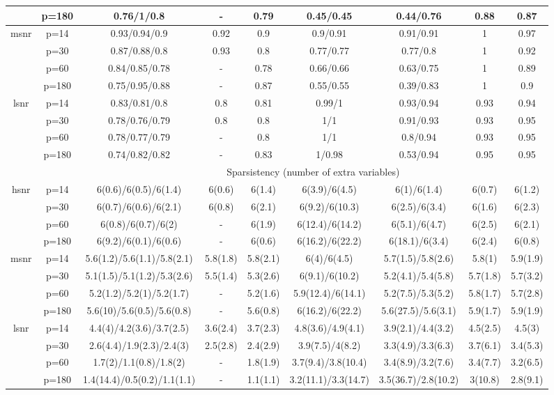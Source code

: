 \begin{table}[ht]
{\begin{tabular}{|c|c|ccccccc|}
   & p=180 & 0.76/1/0.8 & - & 0.79 & 0.45/0.45 & 0.44/0.76 & 0.88 & 0.87 \\ 
  \midrule\multirow{4}[2]{*}{msnr} & p=14 & 0.93/0.94/0.9 & 0.92 & 0.9 & 0.9/0.91 & 0.91/0.91 & 1 & 0.97 \\ 
   & p=30 & 0.87/0.88/0.8 & 0.93 & 0.8 & 0.77/0.77 & 0.77/0.8 & 1 & 0.92 \\ 
   & p=60 & 0.84/0.85/0.78 & - & 0.78 & 0.66/0.66 & 0.63/0.75 & 1 & 0.89 \\ 
   & p=180 & 0.75/0.95/0.88 & - & 0.87 & 0.55/0.55 & 0.39/0.83 & 1 & 0.9 \\ 
  \midrule\multirow{4}[2]{*}{lsnr} & p=14 & 0.83/0.81/0.8 & 0.8 & 0.81 & 0.99/1 & 0.93/0.94 & 0.93 & 0.94 \\ 
   & p=30 & 0.78/0.76/0.79 & 0.8 & 0.8 & 1/1 & 0.91/0.93 & 0.93 & 0.95 \\ 
   & p=60 & 0.78/0.77/0.79 & - & 0.8 & 1/1 & 0.8/0.94 & 0.93 & 0.95 \\ 
   & p=180 & 0.74/0.82/0.82 & - & 0.83 & 1/0.98 & 0.53/0.94 & 0.95 & 0.95 \\ 
   \midrule 
 \multicolumn{1}{|c}{} &       & \multicolumn{7}{c|}{Sparsistency (number of extra variables)} \\
\midrule\multirow{4}[2]{*}{hsnr} & p=14 & 6(0.6)/6(0.5)/6(1.4) & 6(0.6) & 6(1.4) & 6(3.9)/6(4.5) & 6(1)/6(1.4) & 6(0.7) & 6(1.2) \\ 
   & p=30 & 6(0.7)/6(0.6)/6(2.1) & 6(0.8) & 6(2.1) & 6(9.2)/6(10.3) & 6(2.5)/6(3.4) & 6(1.6) & 6(2.3) \\ 
   & p=60 & 6(0.8)/6(0.7)/6(2) & - & 6(1.9) & 6(12.4)/6(14.2) & 6(5.1)/6(4.7) & 6(2.5) & 6(2.1) \\ 
   & p=180 & 6(9.2)/6(0.1)/6(0.6) & - & 6(0.6) & 6(16.2)/6(22.2) & 6(18.1)/6(3.4) & 6(2.4) & 6(0.8) \\ 
  \midrule\multirow{4}[2]{*}{msnr} & p=14 & 5.6(1.2)/5.6(1.1)/5.8(2.1) & 5.8(1.8) & 5.8(2.1) & 6(4)/6(4.5) & 5.7(1.5)/5.8(2.6) & 5.8(1) & 5.9(1.9) \\ 
   & p=30 & 5.1(1.5)/5.1(1.2)/5.3(2.6) & 5.5(1.4) & 5.3(2.6) & 6(9.1)/6(10.2) & 5.2(4.1)/5.4(5.8) & 5.7(1.8) & 5.7(3.2) \\ 
   & p=60 & 5.2(1.2)/5.2(1)/5.2(1.7) & - & 5.2(1.6) & 5.9(12.4)/6(14.1) & 5.2(7.5)/5.3(5.2) & 5.8(1.7) & 5.7(2.8) \\ 
   & p=180 & 5.6(10)/5.6(0.5)/5.6(0.8) & - & 5.6(0.8) & 6(16.2)/6(22.2) & 5.6(27.5)/5.6(3.1) & 5.9(1.7) & 5.9(1.9) \\ 
  \midrule\multirow{4}[2]{*}{lsnr} & p=14 & 4.4(4)/4.2(3.6)/3.7(2.5) & 3.6(2.4) & 3.7(2.3) & 4.8(3.6)/4.9(4.1) & 3.9(2.1)/4.4(3.2) & 4.5(2.5) & 4.5(3) \\ 
   & p=30 & 2.6(4.4)/1.9(2.3)/2.4(3) & 2.5(2.8) & 2.4(2.9) & 3.9(7.5)/4(8.2) & 3.3(4.9)/3.3(6.3) & 3.7(6.1) & 3.4(5.3) \\ 
   & p=60 & 1.7(2)/1.1(0.8)/1.8(2) & - & 1.8(1.9) & 3.7(9.4)/3.8(10.4) & 3.4(8.9)/3.2(7.6) & 3.4(7.7) & 3.2(6.5) \\ 
   & p=180 & 1.4(14.4)/0.5(0.2)/1.1(1.1) & - & 1.1(1.1) & 3.2(11.1)/3.3(14.7) & 3.5(36.7)/2.8(10.2) & 3(10.8) & 2.8(9.1) \\ 
   \bottomrule 
\end{tabular}
}
\end{table}
